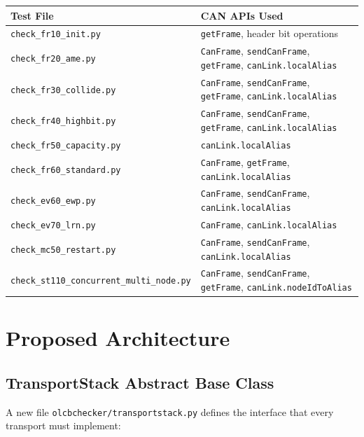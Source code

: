 \begin{tabular}{|l|p{8cm}|}
\hline
\textbf{Test File} & \textbf{CAN APIs Used} \\
\hline
\texttt{check\_fr10\_init.py} & \texttt{getFrame}, header bit operations \\
\hline
\texttt{check\_fr20\_ame.py} & \texttt{CanFrame}, \texttt{sendCanFrame}, \texttt{getFrame}, \texttt{canLink.localAlias} \\
\hline
\texttt{check\_fr30\_collide.py} & \texttt{CanFrame}, \texttt{sendCanFrame}, \texttt{getFrame}, \texttt{canLink.localAlias} \\
\hline
\texttt{check\_fr40\_highbit.py} & \texttt{CanFrame}, \texttt{sendCanFrame}, \texttt{getFrame}, \texttt{canLink.localAlias} \\
\hline
\texttt{check\_fr50\_capacity.py} & \texttt{canLink.localAlias} \\
\hline
\texttt{check\_fr60\_standard.py} & \texttt{CanFrame}, \texttt{getFrame}, \texttt{canLink.localAlias} \\
\hline
\texttt{check\_ev60\_ewp.py} & \texttt{CanFrame}, \texttt{sendCanFrame}, \texttt{canLink.localAlias} \\
\hline
\texttt{check\_ev70\_lrn.py} & \texttt{CanFrame}, \texttt{canLink.localAlias} \\
\hline
\texttt{check\_mc50\_restart.py} & \texttt{CanFrame}, \texttt{sendCanFrame}, \texttt{canLink.localAlias} \\
\hline
\texttt{check\_st110\_concurrent\_multi\_node.py} & \texttt{CanFrame}, \texttt{sendCanFrame}, \texttt{getFrame}, \texttt{canLink.nodeIdToAlias} \\
\hline
\end{tabular}

\section{Proposed Architecture}

\subsection{TransportStack Abstract Base Class}

A new file \texttt{olcbchecker/transportstack.py} defines the interface that
every transport must implement:

